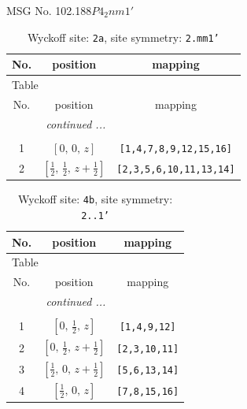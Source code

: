 \documentclass[fleqn,8pt]{jsarticle}
\begin{document}
\setcounter{MaxMatrixCols}{32}

\renewcommand{\tablename}{Table~}
\renewcommand{\figurename}{Figure~}
\begin{center}
\LARGE
MSG No. 102.188\quad$P4_{2}nm1'$
\end{center}
\renewcommand{\arraystretch}{1.2}
\begin{longtable}{ccc}
\caption{Wyckoff site: {\tt 2a}, site symmetry: {\tt 2.mm1'}}
 \\
 \hline \hline
No. & position & mapping \\ \hline \endfirsthead

\multicolumn{2}{l}{\tablename\ \thetable{}} \\
 \hline \hline
No. & position & mapping \\ \hline \endhead

 \hline \hline
\multicolumn{2}{r}{\footnotesize\it continued ...} \\ \endfoot

 \hline \hline
\multicolumn{2}{r}{} \\ \endlastfoot

1 & $\left[ 0,\, 0,\, z \right]$ & {\tt [1,4,7,8,9,12,15,16]} \\ \hline
2 & $\left[ \frac{1}{2},\, \frac{1}{2},\, z + \frac{1}{2} \right]$ & {\tt [2,3,5,6,10,11,13,14]} \\
\end{longtable}
\renewcommand{\arraystretch}{1.2}
\begin{longtable}{ccc}
\caption{Wyckoff site: {\tt 4b}, site symmetry: {\tt 2..1'}}
 \\
 \hline \hline
No. & position & mapping \\ \hline \endfirsthead

\multicolumn{2}{l}{\tablename\ \thetable{}} \\
 \hline \hline
No. & position & mapping \\ \hline \endhead

 \hline \hline
\multicolumn{2}{r}{\footnotesize\it continued ...} \\ \endfoot

 \hline \hline
\multicolumn{2}{r}{} \\ \endlastfoot

1 & $\left[ 0,\, \frac{1}{2},\, z \right]$ & {\tt [1,4,9,12]} \\ \hline
2 & $\left[ 0,\, \frac{1}{2},\, z + \frac{1}{2} \right]$ & {\tt [2,3,10,11]} \\ \hline
3 & $\left[ \frac{1}{2},\, 0,\, z + \frac{1}{2} \right]$ & {\tt [5,6,13,14]} \\ \hline
4 & $\left[ \frac{1}{2},\, 0,\, z \right]$ & {\tt [7,8,15,16]} \\
\end{longtable}
\end{document}
